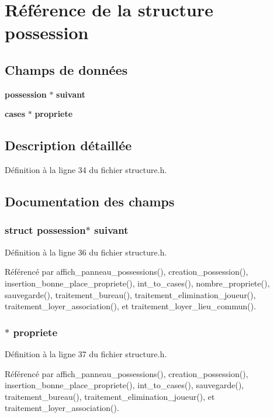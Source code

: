 \section{R\'{e}f\'{e}rence de la structure possession}
\label{structpossession}
\subsection*{Champs de donn\'{e}es}
\begin{CompactItemize}
\item 
{\bf possession} $\ast$ {\bf suivant}
\item 
{\bf cases} $\ast$ {\bf propriete}
\end{CompactItemize}


\subsection{Description d\'{e}taill\'{e}e}




D\'{e}finition \`{a} la ligne 34 du fichier structure.h.

\subsection{Documentation des champs}
\subsubsection{\setlength{\rightskip}{0pt plus 5cm}struct {\bf possession}$\ast$ {\bf suivant}}\label{structpossession_d2cf0b1aadb1a869c82c6720dfbc9e36}




D\'{e}finition \`{a} la ligne 36 du fichier structure.h.

R\'{e}f\'{e}renc\'{e} par affich\_\-panneau\_\-possessions(), creation\_\-possession(), insertion\_\-bonne\_\-place\_\-propriete(), int\_\-to\_\-cases(), nombre\_\-propriete(), sauvegarde(), traitement\_\-bureau(), traitement\_\-elimination\_\-joueur(), traitement\_\-loyer\_\-association(), et traitement\_\-loyer\_\-lieu\_\-commun().
\subsubsection{$\ast$ {\bf propriete}}\label{structpossession_5e54d7b40815342bfd51737d5a96d620}




D\'{e}finition \`{a} la ligne 37 du fichier structure.h.

R\'{e}f\'{e}renc\'{e} par affich\_\-panneau\_\-possessions(), creation\_\-possession(), insertion\_\-bonne\_\-place\_\-propriete(), int\_\-to\_\-cases(), sauvegarde(), traitement\_\-bureau(), traitement\_\-elimination\_\-joueur(), et traitement\_\-loyer\_\-association().